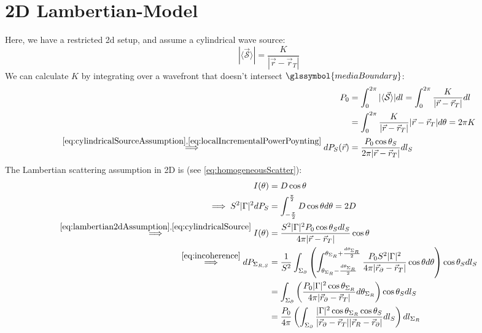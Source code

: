 \documentclass{article}
\begin{document}
\section{2D Lambertian-Model}
Here, we have a restricted 2d setup, and assume a cylindrical wave source:
\begin{equation}
   | \langle \vec{\mathcal{S}} \rangle | = \frac{K}{|\vec{r} - \vec{r}_T|}
   \label{eq:cylindricalSourceAssumption}
\end{equation}
We can calculate $K$ by integrating over a wavefront that doesn't intersect
$\glssymbol{mediaBoundary}$:
\begin{align}
   P_0 &= \int_{0}^{2 \pi} | \langle \vec{\mathcal{S}} \rangle | dl = \int_0^{2 \pi}
      \frac{K}{|\vec{r} - \vec{r}_T|} dl \nonumber \\
   &= \int_0^{2 \pi} \frac{K}{|\vec{r} - \vec{r}_T|} |\vec{r} - \vec{r}_T| d \theta
      = 2 \pi K \nonumber \\ 
   \overset{\eqref{eq:cylindricalSourceAssumption},
      \eqref{eq:localIncrementalPowerPoynting}}{\implies} dP_{S} ( \vec{r} )
      &= \frac{P_0 \cos \theta_{S}}{2 \pi |\vec{r} - \vec{r}_T|}
      dl_{S} \label{eq:cylindricalSource}
\end{align}
The Lambertian scattering assumption in 2D is (see \eqref{eq:homogeneousScatter}):
\begin{align}
   I( \theta ) &= D \cos \theta  \label{eq:lambertian2dAssumption} \\
   \implies S^2 | \Gamma |^2 dP_{S} &=
      \int_{-\frac{\pi}{2}}^{\frac{\pi}{2}} D \cos \theta d \theta = 2D \nonumber \\
   \overset{\eqref{eq:lambertian2dAssumption}
      ,\eqref{eq:cylindricalSource}}{\implies} I( \theta ) &= \frac{S^2 |\Gamma|^2
      P_0 \cos \theta_{S} dl_{S}}{4 \pi |\vec{r} -
      \vec{r}_T|} \cos \theta \nonumber \\
   \overset{\eqref{eq:incoherence}}{\implies} dP_{\Sigma_{R, S}} &=
      \frac{1}{S^2} \int_{\Sigma_\partial} \left( \int_{\theta_{\Sigma_{R}}- \frac{d
      \theta_{\Sigma_{R}}}{2} }^{\theta_{\Sigma_{R}} + \frac{d
      \theta_{\Sigma_{R}}}{2} } \frac{P_0 S^2 |\Gamma|^2 }{4 \pi |\vec{r}_{\partial}
      - \vec{r}_T| } \cos \theta d \theta \right) \cos \theta_{S}
      dl_{S} \nonumber \\
   &= \int_{\Sigma_\partial} \left( \frac{P_0 |\Gamma|^2 \cos
      \theta_{\Sigma_{R}}}{4 \pi |\vec{r}_{\partial} - \vec{r}_T| } d
      \theta_{\Sigma_{R}} \right) \cos \theta_{S} dl_{S} \nonumber \\
   &= \frac{P_0}{4 \pi} \left( \int_{\Sigma_\partial} \frac{|\Gamma|^2 \cos
   \theta_{\Sigma_{R}} \cos \theta_{S} }{|\vec{r}_{\partial}
   - \vec{r}_T||\vec{r}_{R} - \vec{r}_{\partial}|} dl_{S} \right)
   dl_{\Sigma_R} 
\end{align}
\end{document}
